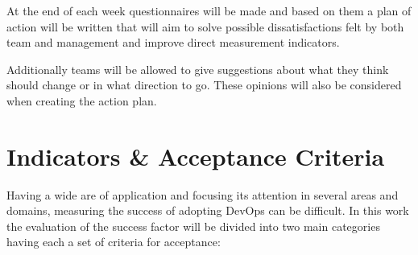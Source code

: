 	At the end of each week questionnaires will be made and based on them a plan of action will be written that will aim to solve possible dissatisfactions felt by both team and management and improve direct measurement indicators. 

	Additionally teams will be allowed to give suggestions about what they think should change or in what direction to go. These opinions will also be considered when creating the action plan. 

\section{Indicators \& Acceptance Criteria}

	Having a wide are of application and focusing its attention in several areas and domains, measuring the success of adopting DevOps can be difficult. In this work the evaluation of the success factor will be divided into two main categories having each a set of criteria for acceptance:



